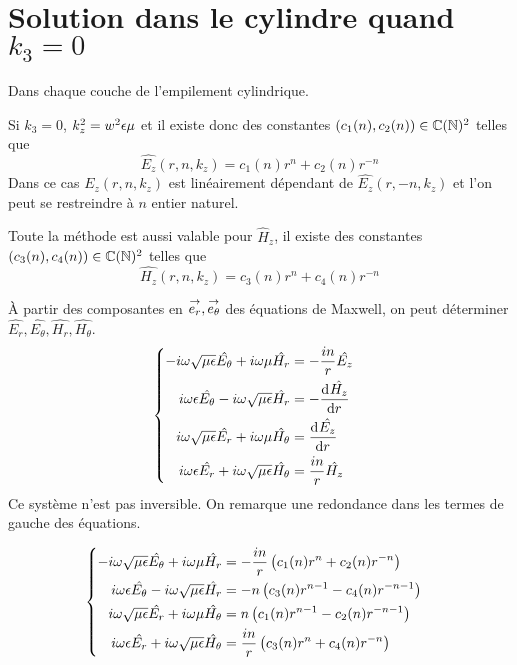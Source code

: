 \section[Solution dans le cylindre quand k3 = 0]{Solution dans le cylindre quand \(k_3 = 0\)}
  \label{sec:annexe:cylindre:k3_nul}

  Dans chaque couche de l'empilement cylindrique.

  Si \(k_3 = 0\), \(k_z^2 = w^2\eps\mu\) et il existe donc des constantes \((c_1(n),c_2(n)) \in \CC(\NN)^2\) telles que
  \begin{equation*}
    \hat{E_z}(r,n,k_z) = c_1(n) r^n + c_2(n)r^{-n}
  \end{equation*}
  Dans ce cas \(\hat{E_z}(r,n,k_z)\) est linéairement dépendant de  \(\hat{E_z}(r,-n,k_z)\) et l'on peut se restreindre à \(n\) entier naturel.

  Toute la méthode est aussi valable pour \(\hat H_z\), il existe des constantes \((c_3(n),c_4(n)) \in \CC(\NN)^2\) telles que
  \begin{equation*}
    \hat{H_z}(r,n,k_z) = c_3(n) r^n + c_4(n)r^{-n}
  \end{equation*}

  À partir des composantes en \(\vect{e_r},\vect{e_\theta}\) des équations de Maxwell, on peut déterminer \(\hat{E_r},\hat{E_\theta},\hat{H_r},\hat{H_\theta}\).
  \begin{align*}
      &\left\lbrace
      \begin{aligned}
          -i\w\sqrt{\mu\eps}\hat{E_\theta} + i\w\mu \hat{H_r} &= -\frac{in}{r}\hat{E_z}
          \\
          i\w\eps \hat{E_\theta} - i\w\sqrt{\mu\eps} \hat{H_r} &= -\ddp{r}{\hat{H_z}}            
          \\
          i\w\sqrt{\mu\eps}\hat{E_r} + i\w\mu \hat{H_\theta} &= \ddp{r}{\hat{E_z}}
          \\
          i\w\eps \hat{E_r} + i\w\sqrt{\mu\eps} \hat{H_\theta} &= \frac{in}{r}\hat{H_z}
      \end{aligned}
      \right.
  \end{align*}
  Ce système n'est pas inversible. On remarque une redondance dans les termes de gauche des équations.

  \begin{align*}
      &\left\lbrace
      \begin{aligned}
          -i\w\sqrt{\mu\eps}\hat{E_\theta} + i\w\mu \hat{H_r} &= -\frac{in}{r}\left(c_1(n) r^n + c_2(n)r^{-n}\right)
          \\
          i\w\eps \hat{E_\theta} - i\w\sqrt{\mu\eps} \hat{H_r} &= -n\left(c_3(n)r^{n-1} - c_4(n)r^{-n-1}\right)           
          \\
          i\w\sqrt{\mu\eps}\hat{E_r} + i\w\mu \hat{H_\theta} &= n\left(c_1(n)r^{n-1} - c_2(n)r^{-n-1}\right)
          \\
          i\w\eps \hat{E_r} + i\w\sqrt{\mu\eps} \hat{H_\theta} &= \frac{in}{r}\left(c_3(n) r^n + c_4(n)r^{-n}\right)
      \end{aligned}
      \right.
  \end{align*}

